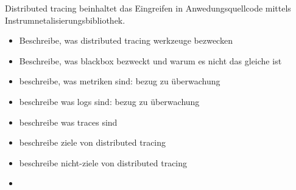 Distributed tracing beinhaltet das Eingreifen in Anwedungsquellcode mittels Instrumnetalisierungsbibliothek.


\begin{itemize}
	\item Beschreibe, was distributed tracing werkzeuge bezwecken
	\item Beschreibe, was blackbox bezweckt und warum es nicht das gleiche ist
	\item beschreibe, was metriken sind: bezug zu überwachung
	\item beschreibe was logs sind: bezug zu überwachung
	\item beschreibe was traces sind
	\item beschreibe ziele von distributed tracing
	\item beschreibe nicht-ziele von distributed tracing
	\item 
\end{itemize}
 
 
